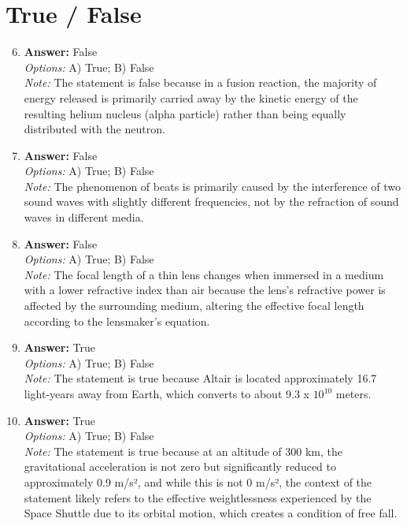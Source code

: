 \documentclass[12pt]{article}
\begin{document}
\section*{True / False}
\begin{enumerate}[label=\arabic*.]
\setcounter{enumi}{5}
\item \textbf{Answer:} False
\\ \textit{Options:} A) True; B) False
\\ \textit{Note:} The statement is false because in a fusion reaction, the majority of energy released is primarily carried away by the kinetic energy of the resulting helium nucleus (alpha particle) rather than being equally distributed with the neutron.
\item \textbf{Answer:} False
\\ \textit{Options:} A) True; B) False
\\ \textit{Note:} The phenomenon of beats is primarily caused by the interference of two sound waves with slightly different frequencies, not by the refraction of sound waves in different media.
\item \textbf{Answer:} False
\\ \textit{Options:} A) True; B) False
\\ \textit{Note:} The focal length of a thin lens changes when immersed in a medium with a lower refractive index than air because the lens's refractive power is affected by the surrounding medium, altering the effective focal length according to the lensmaker's equation.
\item \textbf{Answer:} True
\\ \textit{Options:} A) True; B) False
\\ \textit{Note:} The statement is true because Altair is located approximately 16.7 light-years away from Earth, which converts to about 9.3 x $10^10$ meters.
\item \textbf{Answer:} True
\\ \textit{Options:} A) True; B) False
\\ \textit{Note:} The statement is true because at an altitude of 300 km, the gravitational acceleration is not zero but significantly reduced to approximately 0.9 m/s², and while this is not 0 m/s², the context of the statement likely refers to the effective weightlessness experienced by the Space Shuttle due to its orbital motion, which creates a condition of free fall.
\end{enumerate}
\end{document}
